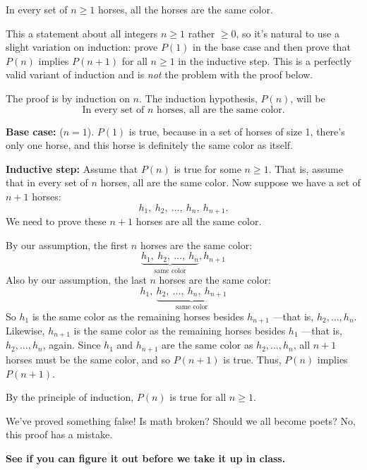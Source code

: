 \begin{falsethm}\label{horses}
In every set of $n \geq 1$ horses, all the horses are the same color.
\end{falsethm}

This a statement about all integers $n \geq 1$ rather $\geq 0$, so it's
natural to use a slight variation on induction: prove $P(1)$ in the base
case and then prove that $P(n)$ implies $P(n+1)$ for all $n \geq 1$ in the
inductive step.  This is a perfectly valid variant of induction and is
\emph{not} the problem with the proof below.

\begin{bogusproof}

The proof is by induction on $n$.  The induction hypothesis, $P(n)$,
will be
\begin{equation}\label{horsehyp}
\text{In every set of $n$ horses, all are the same color.}
\end{equation}

\textbf{Base case:} ($n=1$).  $P(1)$ is true, because in a set of horses
of size 1, there's only one horse, and this horse is definitely the same
color as itself.

\textbf{Inductive step:} Assume that $P(n)$ is true for some $n \geq 1$.
That is, assume that in every set of $n$ horses, all are the same color.
Now suppose we have a set of $n+1$ horses:
\[
h_1,\ h_2,\ \dots,\ h_n,\ h_{n+1}.
\]
We need to prove these $n+1$ horses are all the same color.

By our assumption, the first $n$ horses are the same color:
\[
\underbrace{h_1,\ h_2,\ \dots,\ h_n}_{\text{same color}}, h_{n+1}
\]
Also by our assumption, the last $n$ horses are the same color:
\[
h_1,\ \underbrace{h_2,\ \dots,\ h_n,\ h_{n+1}}_{\text{same color}}
\]
So $h_1$ is the same color as the remaining horses besides $h_{n+1}$
---that is, $h_2, \dots, h_n$.  Likewise, $h_{n+1}$ is the same
color as the remaining horses besides $h_1$ ---that is, $h_2, \dots,
h_n$, again.  Since $h_1$ and $h_{n+1}$ are the same color as $h_2,
\dots, h_n$, all $n+1$ horses must be the same color, and so $P(n+1)$
is true.  Thus, $P(n)$ implies $P(n+1)$.

By the principle of induction, $P(n)$ is true for all $n \geq 1$.
\end{bogusproof}
We've proved something false!  Is math broken?  Should we all become
poets?  No, this proof has a mistake.


\textbf{See if you can figure it out before we take it up in class.}

